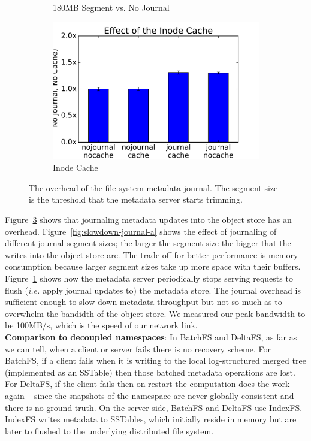 \begin{figure}[t]
\begin{subfigure}[b]{.3\linewidth}
      \caption{180MB Segment vs. No Journal}
      \label{fig:slowdown-journal-b}
  \end{subfigure}
  \begin{subfigure}[b]{.3\linewidth}
      \centering
      \includegraphics[width=1.0\linewidth]{graphs/slowdown-cache.png}
      \caption{Inode Cache}
      \label{fig:slowdown-journal-c}
  \end{subfigure}
  \caption{The overhead of the file system metadata journal. The segment size
  is the threshold that the metadata server starts
  trimming.\label{fig:slowdown-journal}}
\end{figure}

Figure~\ref{fig:slowdown-journal} shows that journaling metadata updates into
the object store has an overhead. Figure~\ref{fig:slowdown-journal-a} shows the
effect of journaling of different journal segment sizes; the larger the segment
size the bigger that the writes into the object store are. The trade-off for
better performance is memory consumption because larger segment sizes take up
more space with their buffers. Figure~\ref{fig:slowdown-journal-b} shows how
the metadata server periodically stops serving requests to flush ({\it i.e.}
apply journal updates to) the metadata store.  The journal overhead is
sufficient enough to slow down metadata throughput but not so much as to
overwhelm the bandidth of the object store. We measured our peak bandwidth to
be 100MB/s, which is the speed of our network link.\\

\noindent\textbf{Comparison to decoupled namespaces}: In BatchFS and DeltaFS,
as far as we can tell, when a client or server fails there is no recovery
scheme. For BatchFS, if a client fails when it is writing to the local
log-structured merged tree (implemented as an SSTable) then those batched
metadata operations are lost. For DeltaFS, if the client fails then on restart
the computation does the work again -- since the snapshots of the namespace are
never globally consistent and there is no ground truth.  On the server side,
BatchFS and DeltaFS use IndexFS. IndexFS writes metadata to SSTables, which
initially reside in memory but are later to flushed to the underlying
distributed file system.

